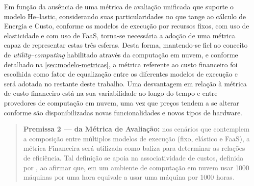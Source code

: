 \documentclass[english,brazilian]{UNISINOSmonografia} %
\begin{document}
Em função da ausência de uma métrica de avaliação unificada que suporte o modelo \textsf{He}--lastic, considerando suas particularidades no que tange ao cálculo de Energia e Custo, conforme os modelos de execução por recursos fixos, com uso de elasticidade e com uso de FaaS, torna-se necessária a adoção de uma métrica capaz de representar estas três esferas.
Desta forma, mantendo-se fiel ao conceito de \textit{utility--computing} habilitado através da computação em nuvem, e conforme detalhado na \autoref{sec:modelo-metricas}, a métrica referente ao custo financeiro foi escolhida como fator de equalização entre os diferentes modelos de execução e será adotada no restante deste trabalho.
Uma desvantagem em relação à métrica de custo financeiro está na sua variabilidade ao longo do tempo e entre provedores de computação em nuvem, uma vez que preços tendem a se alterar conforme são disponibilizadas novas funcionalidades e novos tipos de hardware.
\begin{quote}
	\textbf{Premissa 2 --- da Métrica de Avaliação:} nos cenários que contemplem a composição entre múltiplos modelos de execução (fixo, elástico e FaaS), a métrica Financeira será utilizada como baliza para determinar as relações de eficiência. Tal definição se apoia na associatividade de custos, definida por , ao afirmar que, em um ambiente de computação em nuvem usar 1000 máquinas por uma hora equivale a usar uma máquina por 1000 horas.
\end{quote}
\end{document}

